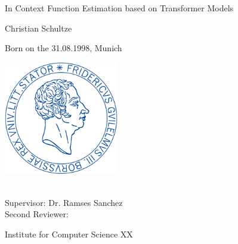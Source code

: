\begin{titlepage}
    \begin{center}
        \large

        \hfill

        \vfill

        \begingroup
            \Large {In Context Function Estimation based on Transformer Models} \\ \bigskip
        \endgroup

        {Christian Schultze} \\ \bigskip
        
        Born on the 31.08.1998, Munich \\ \bigskip
        

        \vfill

        \includegraphics[width=5cm]{abbildungen/titelseite/siegel_unibonn} \\ \bigskip\bigskip

        \mySubtitle \\ \bigskip\bigskip
        Supervisor: Dr. Ramses Sanchez \\ 
        Second Reviewer:  \\\medskip
       
        Institute for Computer Science XX \\ \medskip
        \myFaculty \\
        \myUni \\ \bigskip\bigskip
        
        
        \myTime\ %


        \vfill

    \end{center}
\end{titlepage}
